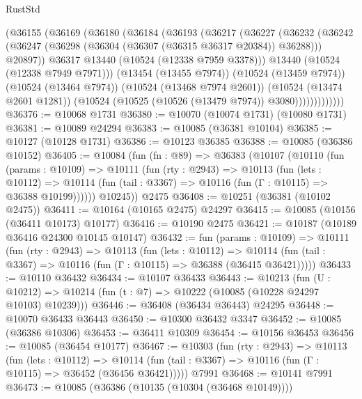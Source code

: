 \begin{lexlean}{RustStd}
\begin{coremodule}
                (@36155
                  (@36169
                    (@36180
                      (@36184
                        (@36193
                          (@36217
                            (@36227
                              (@36232
                                (@36242
                                  (@36247 (@36298 (@36304 (@36307 (@36315 @36317 @20384)) @36288)))
                                  @20897))
                              @36317
                              @13440
                              (@10524 (@12338 @7959 @3378)))
                            @13440
                            (@10524 (@12338 @7949 @7971)))
                          (@13454 (@13455 @7974))
                          (@10524 (@13459 @7974))
                          (@10524 (@13464 @7974))
                          (@10524 (@13468 @7974 @2601))
                          (@10524 (@13474 @2601 @1281))
                          (@10524 (@10525 (@10526 (@13479 @7974)) @3080)))))))))))))
@36376 := @10068 @1731
@36380 := @10070 (@10074 @1731) (@10080 @1731)
@36381 := @10089 @24294
@36383 := @10085 (@36381 @10104)
@36385 := @10127 (@10128 @1731)
@36386 := @10123 @36385
@36388 := @10085 (@36386 @10152)
@36405 := @10084
    (fun (fn : @89) =>
    @36383
      (@10107
        (@10110
          (fun (params : @10109) =>
          @10111
            (fun (rty : @2943) =>
            @10113
              (fun (lets : @10112) =>
              @10114 (fun (tail : @3367) => @10116 (fun (Γ : @10115) => @36388 @10199))))))
        @10245))
    @2475
@36408 := @10251 (@36381 (@10102 @2475))
@36411 := @10164 (@10165 @2475) @24297
@36415 := @10085 (@10156 (@36411 @10173) @10177)
@36416 := @10190 @2475
@36421 := @10187 (@10189 @36416 @24300 @10145 @10147)
@36432 := fun (params : @10109) =>
  @10111
    (fun (rty : @2943) =>
    @10113
      (fun (lets : @10112) =>
      @10114 (fun (tail : @3367) => @10116 (fun (Γ : @10115) => @36388 (@36415 @36421)))))
@36433 := @10110 @36432
@36434 := @10107 @36433
@36443 := @10213
    (fun (U : @10212) => @10214 (fun (t : @7) => @10222 (@10085 (@10228 @24297 @10103) @10239)))
@36446 := @36408 (@36434 @36443) @24295
@36448 := @10070 @36433 @36443
@36450 := @10300 @36432 @3347
@36452 := @10085 (@36386 @10306)
@36453 := @36411 @10309
@36454 := @10156 @36453
@36456 := @10085 (@36454 @10177)
@36467 := @10303
    (fun (rty : @2943) =>
    @10113
      (fun (lets : @10112) =>
      @10114 (fun (tail : @3367) => @10116 (fun (Γ : @10115) => @36452 (@36456 @36421)))))
    @7991
@36468 := @10141 @7991
@36473 := @10085 (@36386 (@10135 (@10304 (@36468 @10149))))

\end{coremodule}
\end{lexlean}
